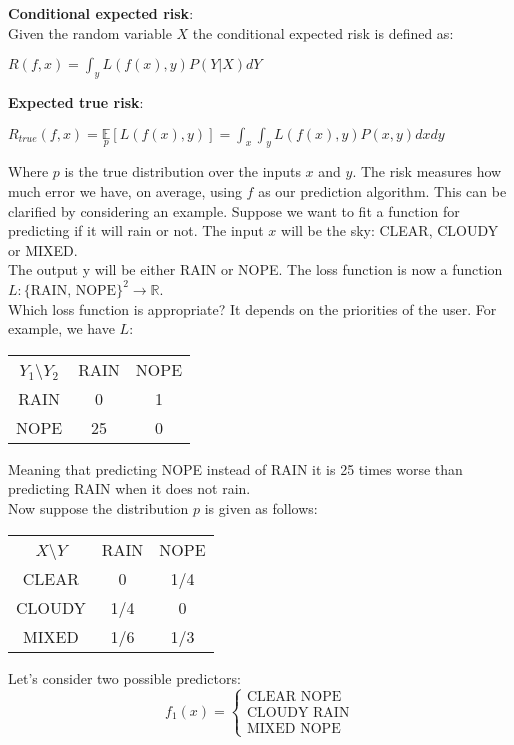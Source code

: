 \documentclass[twoside]{article}
\begin{document}
\textbf{Conditional expected risk}:\\
Given the random variable $X$ the conditional expected risk is defined as:
\begin{center}
    $R(f,x) = \int_y L(f(x), y)P(Y | X) dY$
\end{center}
\textbf{Expected true risk}:
\begin{center}
    $R_{true}(f,x) = \underset{p}{\mathbb{E}}[L(f(x), y)] = \int_x\int_y L(f(x), y)P(x, y) dx dy$
\end{center}
Where $p$ is the true distribution over the inputs $x$ and $y$. The risk measures how much error we have, on average,  using $f$ as our prediction algorithm.
\newpage
This can be clarified by considering an example. Suppose we want to fit a function for predicting if it will rain or not. The input $x$ will be the sky: CLEAR, CLOUDY or MIXED.\\
The output y will be either RAIN or NOPE. The loss function is now a function $L : \{\text{RAIN, NOPE}\}^2 \rightarrow \mathbb{R}$.\\
Which loss function is appropriate? It depends on the priorities of the user. For example, we have $L$:
\begin{center}
\begin{tabular}{ |c|c|c| } 
 \hline
 $Y_1$\textbackslash $Y_2$ & RAIN & NOPE \\ 
 RAIN & 0 & 1 \\ 
 NOPE & 25 & 0 \\ 
 \hline
\end{tabular}
\end{center}
Meaning that predicting NOPE instead of RAIN it is 25 times worse than predicting RAIN when it does not rain.\\
Now suppose the distribution $p$ is given as follows:
\begin{center}
\begin{tabular}{ |c|c|c| } 
 \hline
 $X$\textbackslash $Y$ & RAIN & NOPE \\ 
 CLEAR & 0 & 1/4 \\ 
 CLOUDY & 1/4 & 0 \\ 
 MIXED & 1/6 & 1/3 \\ 
 \hline
\end{tabular}
\end{center}
Let's consider two possible predictors:
\begin{equation*}
    f_1(x) = \begin{cases}
        \text{CLEAR NOPE} \\
        \text{CLOUDY RAIN} \\
        \text{MIXED NOPE} 
    \end{cases}
\end{equation*}
\end{document}
